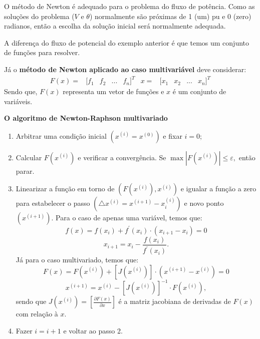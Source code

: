 O método de Newton é adequado para o problema do fluxo de potência. Como as soluções do problema ($V$ e $\theta$) normalmente são próximas de 1 (um) pu e 0 (zero) radianos, então a escolha da solução inicial será normalmente adequada.

A diferença do fluxo de potencial do exemplo anterior é que temos
um conjunto de funções para resolver.

Já o \textbf{método de Newton aplicado ao caso multivariável} deve considerar:
\[
\begin{matrix} 
F(x)= & [f_{ 1 } & { f }_{ 2 } & ... & { f }_{ n }{ ] }^{ T } 
\end{matrix}
\begin{matrix} 
x= & [x_{ 1 } & { x }_{ 2 } & ... & { x }_{ n }{ ] }^{ T } 
\end{matrix}
\]
Sendo que, $F(x)$ representa um vetor de funções e $x$ é um conjunto
de variáveis.


\begin{framed} %
    \textbf{O algoritmo de Newton-Raphson multivariado}
    \begin{enumerate}
    \item Arbitrar uma condição inicial $(x^{(i)}=x^{(0)})$ e fixar $i=0$;
    
    \item Calcular $F(x^{(i)})$ e verificar a convergência. Se $\max| F(x^{(i)})|\leq \varepsilon,$ então parar.
    
    \item Linearizar a função em torno de $(F(x^{(i)}),x^{(i)})$ e igualar
    a função a zero para estabelecer o passo $(\triangle x^{(i)}=x^{(i+1)}-x_{i}^{(i)})$
    e novo ponto $(x^{(i+1)})$.
    Para o caso de apenas uma variável, temos que:
    \[
    f(x)=f(x_{i})+f^{'}(x_{i})\cdot(x_{i+1}-x_{i})=0
    \]
    \[
    x_{i+1}=x_{i}-\frac{f(x_{i})}{f^{'}(x_{i})}.
    \]
    Já para o caso multivariado, temos que:
    \[
    F(x)=F(x^{(i)})+[J(x^{(i)})]\cdot(x^{(i+1)}-x^{(i)})=0
    \]
    \[
    x^{(i+1)}=x^{(i)}-[J(x^{(i)})]^{-1}\cdot F(x^{(i)}),
    \]
    sendo que $J(x^{(i)})=[\frac{\partial F(x)}{\partial x}]$ é a matriz jacobiana
    de derivadas de $F(x)$ com relação à $x$.
    \item Fazer $i=i+1$ e voltar ao passo 2.
    \end{enumerate}
    
    
\end{framed}


